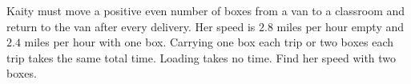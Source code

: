 Kaity must move a positive even number of boxes from a van to a classroom and return to the van after every delivery. Her speed is $2.8$ miles per hour empty and $2.4$ miles per hour with one box. Carrying one box each trip or two boxes each trip takes the same total time. Loading takes no time. Find her speed with two boxes.

